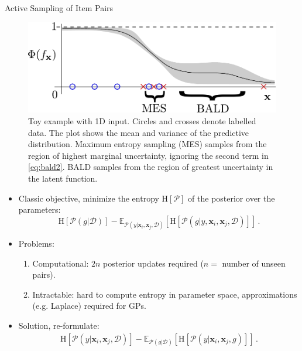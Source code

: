 \documentclass[final]{beamer}
\newlength{\onecolwid}
\newcommand{\data}{\mathcal{D}}
\newcommand{\ent}{\mathrm{H}}
\newcommand{\E}{\mathbb{E}}
\begin{document}
\begin{frame}[t]
\begin{columns}[t]
\begin{column}{\onecolwid}
      \begin{block}{Active Sampling of Item Pairs}
      \begin{figure}
        \includegraphics[scale = 1.3]{figs/BALD_eg.pdf}
        \caption{Toy example with 1D input. Circles and crosses
        denote labelled data. The plot shows the mean and variance of the predictive
        distribution. Maximum entropy sampling (MES)
        samples from the region of highest marginal uncertainty, ignoring the
        second term in \eqref{eq:bald2}. BALD samples
        from the region of greatest uncertainty in the latent function.\label{fig:bald}}
      \end{figure}
      \begin{itemize}
        \item Classic objective, minimize the entropy $\ent[\mathcal{P}]$
        of the posterior over the parameters:
        \begin{equation}
          \ent[\mathcal{P}(g|\mathcal{D})] - \E_{\mathcal{P}(y|\mathbf{x}_i,\mathbf{x}_j,\data)}
          \left[ \ent[\mathcal{P}(g|y,\mathbf{x}_i,\mathbf{x}_j,\data)]\right]\,. \label{eq:bald1}
        \end{equation}
        \item Problems:
        \begin{enumerate}
          \normalsize
          \item Computational: $2n$ posterior updates required ($n=$ number of unseen pairs).
          \item Intractable: hard to compute entropy in parameter space,
          approximations (e.g. Laplace) required for GPs.
        \end{enumerate}
        \item Solution, re-formulate:
          \begin{align}
            \ent[\mathcal{P}(y|\mathbf{x}_i,\mathbf{x}_j,\data)] - \E_{\mathcal{P}(g|\data)}
            \left[\ent\left[ \mathcal{P}(y|\mathbf{x}_i,\mathbf{x}_j,g)\right]\right]\,.
            \label{eq:bald2}

\end{align}
\end{itemize}
\end{block}
\end{column}
\end{columns}
\end{frame}
\end{document}
